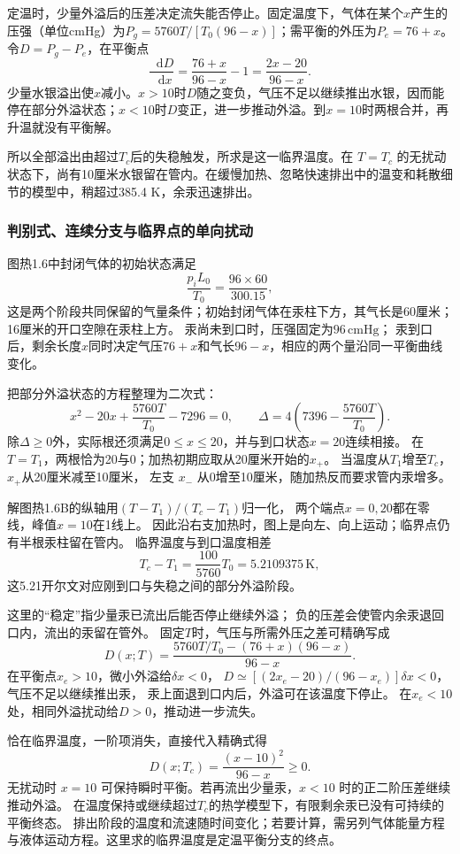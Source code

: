 \documentclass[UTF8,fontset=fandol,a4paper,11pt]{ctexart}
\newcommand{\dd}{\mathop{}\!\mathrm{d}}
\begin{document}
定温时，少量外溢后的压差决定流失能否停止。固定温度下，气体在某个$x$产生的压强（单位cmHg）为$P_g=5760T/[T_0(96-x)]$；需平衡的外压为$P_e=76+x$。令$D=P_g-P_e$，在平衡点
\[\frac{\dd D}{\dd x}=\frac{76+x}{96-x}-1
=\frac{2x-20}{96-x}.\]
少量水银溢出使$x$减小。$x>10$时$D$随之变负，气压不足以继续推出水银，因而能停在部分外溢状态；$x<10$时$D$变正，进一步推动外溢。到$x=10$时两根合并，再升温就没有平衡解。

所以全部溢出由超过$T_c$后的失稳触发，所求是这一临界温度。在 $T=T_c$ 的无扰动状态下，尚有10厘米水银留在管内。在缓慢加热、忽略快速排出中的温变和耗散细节的模型中，稍超过385.4 K，余汞迅速排出。
\subsubsection*{判别式、连续分支与临界点的单向扰动}
图热1.6中封闭气体的初始状态满足
\[
\frac{p_iL_0}{T_0}=\frac{96\times60}{300.15},
\]
这是两个阶段共同保留的气量条件；初始封闭气体在汞柱下方，其气长是60厘米；16厘米的开口空隙在汞柱上方。
汞尚未到口时，压强固定为$96\,\mathrm{cmHg}$；
汞到口后，剩余长度$x$同时决定气压$76+x$和气长$96-x$，相应的两个量沿同一平衡曲线变化。

把部分外溢状态的方程整理为二次式：
\[
x^2-20x+\frac{5760T}{T_0}-7296=0,\qquad
\Delta=4\left(7396-\frac{5760T}{T_0}\right).
\]
除$\Delta\ge0$外，实际根还须满足$0\le x\le20$，并与到口状态$x=20$连续相接。
在$T=T_1$，两根恰为20与0；加热初期应取从20厘米开始的$x_+$。
当温度从$T_1$增至$T_c$，$x_+$从20厘米减至10厘米，
左支 $x_-$ 从0增至10厘米，随加热反而要求管内汞增多。

解图热1.6B的纵轴用$(T-T_1)/(T_c-T_1)$归一化，
两个端点$x=0,20$都在零线，峰值$x=10$在1线上。
因此沿右支加热时，图上是向左、向上运动；临界点仍有半根汞柱留在管内。
临界温度与到口温度相差
\[
T_c-T_1=\frac{100}{5760}T_0
=5.2109375\,\mathrm K,
\]
这5.21开尔文对应刚到口与失稳之间的部分外溢阶段。

这里的“稳定”指少量汞已流出后能否停止继续外溢；
负的压差会使管内余汞退回口内，流出的汞留在管外。
固定$T$时，气压与所需外压之差可精确写成
\[
D(x;T)=\frac{5760T/T_0-(76+x)(96-x)}{96-x}.
\]
在平衡点$x_e>10$，微小外溢给$\delta x<0$，
$D\simeq[(2x_e-20)/(96-x_e)]\delta x<0$，气压不足以继续推出汞，
汞上面退到口内后，外溢可在该温度下停止。
在$x_e<10$处，相同外溢扰动给$D>0$，推动进一步流失。

恰在临界温度，一阶项消失，直接代入精确式得
\[
D(x;T_c)=\frac{(x-10)^2}{96-x}\ge0.
\]
无扰动时 $x=10$ 可保持瞬时平衡。若再流出少量汞，$x<10$ 时的正二阶压差继续推动外溢。
在温度保持或继续超过$T_c$的热学模型下，有限剩余汞已没有可持续的平衡终态。
排出阶段的温度和流速随时间变化；若要计算，需另列气体能量方程与液体运动方程。这里求的临界温度是定温平衡分支的终点。
\end{document}
